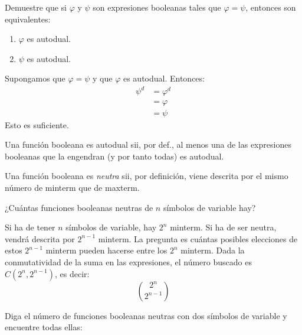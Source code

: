\begin{exercise}
  Demuestre que si $\varphi$ y $\psi$ son expresiones booleanas tales
  que $\varphi=\psi$, entonces son equivalentes:
  \begin{enumerate}
  \item $\varphi$ es autodual.
  \item $\psi$ es autodual.
  \end{enumerate}
\end{exercise}

\begin{solution}
  Supongamos que $\varphi=\psi$ y que $\varphi$ es autodual. Entonces:
  \begin{align*}
    \psi^{d}&=\varphi^{d}\\
            &=\varphi\\
            &=\psi
  \end{align*}
  Esto es suficiente.
\end{solution}

\begin{definition}
  Una función booleana es autodual sii, por def., al menos una de
  las expresiones booleanas que la engendran (y por tanto todas) es
  autodual.
\end{definition}

\begin{definition}
   Una función booleana es
  \textit{neutra} sii, por definición, viene descrita por el mismo
  número de minterm que de maxterm.
\end{definition}

\begin{exercise}
  ¿Cuántas funciones booleanas neutras de $n$ símbolos de variable hay?
\end{exercise}

\begin{solution}
  Si ha de tener $n$ símbolos de variable, hay $2^{n}$ minterm. Si ha
  de ser neutra, vendrá descrita por $2^{n-1}$ minterm. La pregunta es
  cuántas posibles elecciones de estos $2^{n-1}$ minterm pueden
  hacerse entre los $2^{n}$ minterm. Dada la conmutatividad de la suma
  en las expresiones, el número buscado es $C(2^{n},2^{n-1})$, es decir:
  \begin{equation*}
    \binom{2^{n}}{2^{n-1}}
  \end{equation*}
\end{solution}

\begin{exercise}
  \label{exer:neutras2}
  Diga el número de funciones booleanas neutras con dos símbolos de
  variable y encuentre todas ellas:
\end{exercise}

